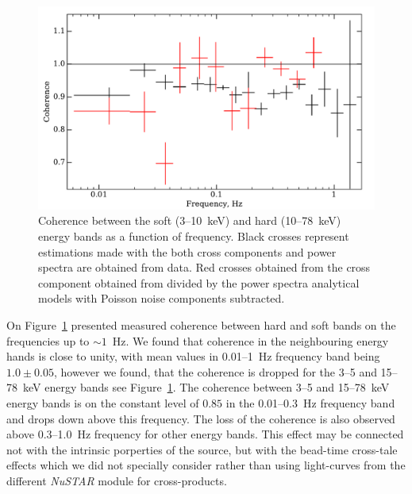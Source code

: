 \documentclass[a4paper,fleqn,usenatbib]{mnras}
\def\grs{{GRS\,1739-278\,}}
\begin{document}
\begin{figure}
    \includegraphics[width=\columnwidth]{coherence_3.pdf}
    \caption{Coherence between the soft (3--10~keV) and hard (10--78~keV) energy bands as a function of frequency. 
     Black crosses  represent estimations made with the both cross components and power spectra are obtained from data.
     Red crosses obtained from the cross component obtained from divided by the power spectra analytical models with Poisson noise components subtracted.}
    \label{fig:coherence}
\end{figure}


On Figure~\ref{fig:coherence} presented measured coherence between hard and soft bands on the frequencies up to $\sim1$~Hz. 
We found that coherence in the neighbouring energy hands is close to unity, with mean values in 0.01--1~Hz frequency band being $1.0\pm0.05$, however we found, that the coherence is dropped for the 3--5 and 15--78~keV energy bands see Figure~\ref{fig:coherence}.
The coherence between 3--5 and 15--78~keV energy bands is on the constant level of $0.85$ in the 0.01--0.3~Hz frequency band and drops down above this frequency.
The loss of the coherence is also observed above 0.3--1.0~Hz frequency for other energy bands. 
This effect may be connected not with the intrinsic porperties of the source, but with the bead-time cross-tale effects which we did not specially consider rather than using light-curves from the different {\it NuSTAR} module for cross-products.
\end{document}
